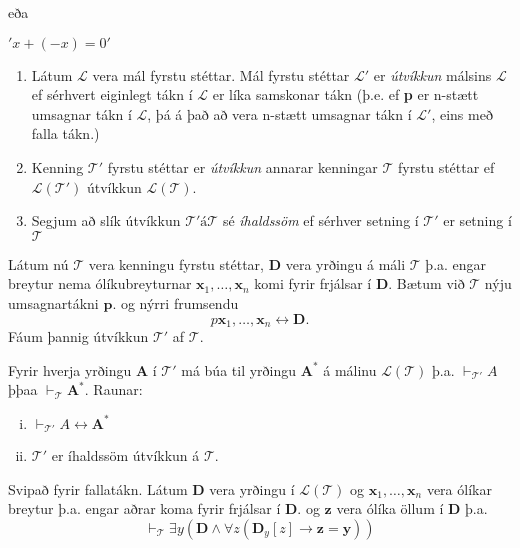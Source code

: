 \documentclass[12pt]{article}
\begin{document}
eða

$'x + (-x) = 0'$


\begin{skgr}
\begin{enumerate}
	\item Látum $\mathcal{L}$ vera mál fyrstu stéttar. Mál fyrstu stéttar $\mathcal{L}'$ er \emph{útvíkkun} málsins $\mathcal{L}$
		ef sérhvert eiginlegt tákn í $\mathcal{L}$ er líka samskonar tákn (þ.e. ef \textbf{p} er n-stætt umsagnar tákn í $\mathcal{L}$,
		þá á það að vera n-stætt umsagnar tákn í $\mathcal{L}'$, eins með falla tákn.)
	\item Kenning \(\mathcal{T}'\) fyrstu stéttar er \emph{útvíkkun} annarar kenningar \(\mathcal{T}\) fyrstu stéttar ef $\mathcal{L(T')}$
		útvíkkun $\mathcal{L(T)}$.
	\item Segjum að slík útvíkkun $\mathcal{T'} á \mathcal{T}$ sé \emph{íhaldssöm} ef sérhver setning í $\mathcal{T'}$
		er setning í $\mathcal{T}$
\end{enumerate}
\end{skgr}

Látum nú $\mathcal{T}$ vera kenningu fyrstu stéttar, $\mathbf{D}$ vera yrðingu á máli $\mathcal{T}$ þ.a. engar breytur nema ólíkubreyturnar
$\mathbf{x}_1, \dotsc, \mathbf{x}_n$ komi fyrir frjálsar í $\mathbf{D}$. Bætum við $\mathcal{T}$ nýju umsagnartákni $\mathbf{p}$.
og nýrri frumsendu
\[ p \mathbf{x}_1, \dotsc, \mathbf{x}_n \leftrightarrow \mathbf{D} .\]
Fáum þannig útvíkkun $\mathcal{T'}$ af $\mathcal{T}$.

\begin{setn}
Fyrir hverja yrðingu $\mathbf{A}$ í $\mathcal{T'}$ má búa til yrðingu $\mathbf{A}^{*}$ á málinu $\mathcal{L(T)}$
þ.a. $\vdash_{\mathcal{T'}} A$ þþaa $\vdash_{\mathcal{T}} \mathbf{A}^{*}$. Raunar:

\begin{enumerate}[(i)]
\item $\vdash_{\mathcal{T'}} A \leftrightarrow \mathbf{A}^{*}$
\item $\mathcal{T'}$ er íhaldssöm útvíkkun á $\mathcal{T}$.
\end{enumerate}

\end{setn}


Svipað fyrir fallatákn. Látum $\mathbf{D}$ vera yrðingu í
$\mathcal{L(T)}$ og $\mathbf{x}_1, \dotsc, \mathbf{x}_n$
vera ólíkar breytur þ.a. engar aðrar koma fyrir frjálsar í 
$\mathbf{D}$. og $\mathbf{z}$ vera ólíka öllum í $\mathbf{D}$
þ.a.
\[ \vdash_{\mathcal{T}} \exists y ( \mathbf{D} \wedge \forall z ( \mathbf{D}_{y} [z] \rightarrow \mathbf{z} = \mathbf{y})) \]
\end{document}
